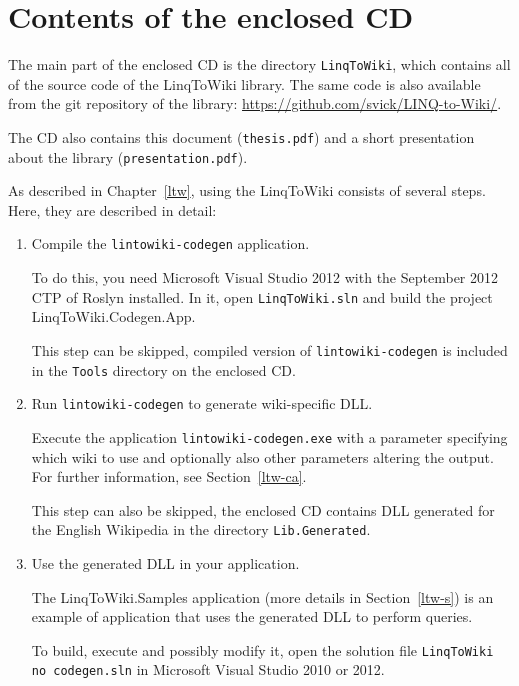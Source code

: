 \chapter{Contents of the enclosed CD}

The main part of the enclosed CD is the directory \texttt{LinqToWiki},
which contains all of the source code of the LinqToWiki library.
The same code is also available from the git repository of the library:
\url{https://github.com/svick/LINQ-to-Wiki/}.

The CD also contains this document (\texttt{thesis.pdf})
and a short presentation about the library (\texttt{presentation.pdf}).


As described in Chapter~\ref{ltw}, using the LinqToWiki consists of several steps.
Here, they are described in detail:

\begin{enumerate}
\item Compile the \texttt{lintowiki-codegen} application.

To do this, you need Microsoft Visual Studio 2012 with the September 2012 \ac{CTP} of Roslyn installed.
In it, open \texttt{LinqToWiki.sln} and build the project LinqToWiki.Codegen.App.

This step can be skipped, compiled version of \texttt{lintowiki-codegen} is included
in the \texttt{Tools} directory on the enclosed CD.

\item Run \texttt{lintowiki-codegen} to generate wiki-specific \ac{DLL}.

Execute the application \texttt{lintowiki-codegen.exe} with a parameter specifying which wiki
to use and optionally also other parameters altering the output. For further information, see Section~\ref{ltw-ca}.

This step can also be skipped, the enclosed CD contains \ac{DLL} generated for the English Wikipedia
in the directory \texttt{Lib\string\LinqToWiki.Generated}.

\item Use the generated \ac{DLL} in your application.

The LinqToWiki.Samples application (more details in Section~\ref{ltw-s}) is an example of application
that uses the generated \ac{DLL} to perform queries.

To build, execute and possibly modify it, open the solution file \texttt{LinqToWiki no codegen.sln}
in Microsoft Visual Studio 2010 or 2012.
\end{enumerate}